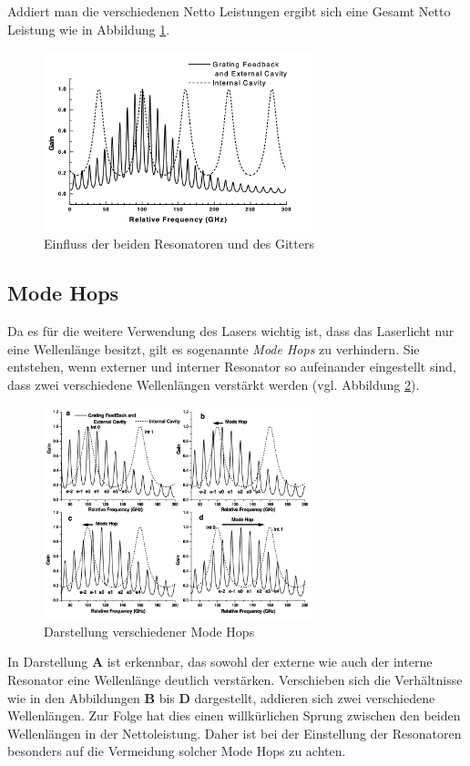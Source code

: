 Addiert man die verschiedenen Netto Leistungen ergibt sich eine Gesamt Netto Leistung wie in Abbildung \ref{fig:netto}.
\begin{figure}
    \centering
    \includegraphics[width=0.7\textwidth]{abb/netto.png}
    \caption{Einfluss der beiden Resonatoren und des Gitters \cite{laser}}
    \label{fig:netto}
\end{figure}

\subsection{Mode Hops}
Da es für die weitere Verwendung des Lasers wichtig ist,
dass das Laserlicht nur eine Wellenlänge besitzt,
gilt es sogenannte \textit{Mode Hops} zu verhindern.
Sie entstehen, 
wenn externer und interner Resonator so aufeinander eingestellt sind,
dass zwei verschiedene Wellenlängen verstärkt werden (vgl. Abbildung \ref{fig:modehops}).
\begin{figure}
    \centering
    \includegraphics[width=0.7\textwidth]{abb/modehops.png}
    \caption{Darstellung verschiedener Mode Hops \cite{laser}}
    \label{fig:modehops}
\end{figure}
In Darstellung \textbf{A} ist erkennbar, das sowohl der externe wie auch der interne Resonator eine Wellenlänge deutlich verstärken.
Verschieben sich die Verhältnisse
wie in den Abbildungen \textbf{B} bis \textbf{D} dargestellt,
addieren sich zwei verschiedene Wellenlängen.
Zur Folge hat dies einen willkürlichen Sprung zwischen den beiden Wellenlängen in der Nettoleistung.
Daher ist bei der Einstellung der Resonatoren besonders auf die Vermeidung solcher Mode Hops zu achten.



